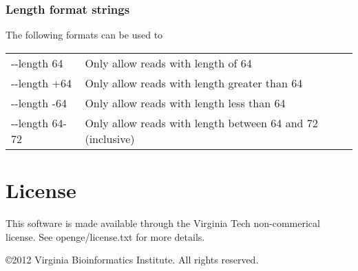 \documentclass[11pt]{article}
\begin{document}
\subsubsection{Length format strings}
The following formats can be used to 
\begin{center}
\begin{tabular}{lp{3.5in}}
{-}{-}length 64&Only allow reads with length of 64\\
{-}{-}length +64&Only allow reads with length greater than 64\\
{-}{-}length -64&Only allow reads with length less than 64\\
{-}{-}length 64-72&Only allow reads with length between 64 and 72 (inclusive)\\
\end{tabular}
\end{center}

\section {License}
This software is made available through the Virginia Tech non-commerical license. See openge/license.txt for more details. 

\copyright 2012 Virginia Bioinformatics Institute. All rights reserved.
\end{document}
